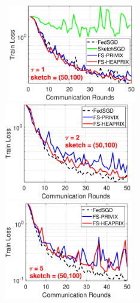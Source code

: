 \documentclass[twoside]{article}
\begin{document}
\begin{figure}[H]
\begin{center}
		\mbox{\hspace{-0.15in}	  
		\includegraphics[width=2.2in]{MNIST_figures/local1_sketch50_iid0_train_loss.eps} \hspace{-0.15in}
		\includegraphics[width=2.2in]{MNIST_figures/local2_sketch50_iid0_train_loss.eps} \hspace{-0.15in}
		\includegraphics[width=2.2in]{MNIST_figures/local5_sketch50_iid0_train_loss.eps}}
		

\end{center}
\end{figure}
\end{document}
